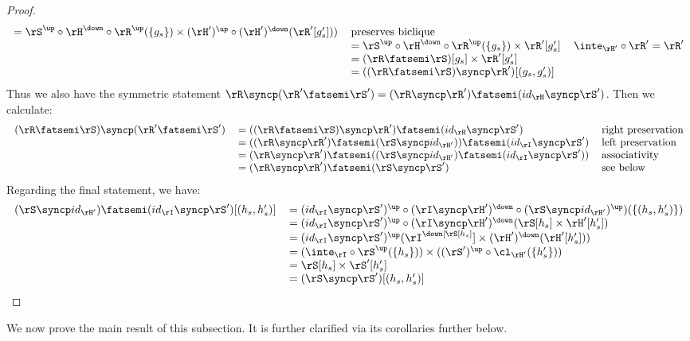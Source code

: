 \documentclass{article}
\begin{document}
\begin{proof}
\[\begin{tabular}{lll}
$= \rS^\up \circ \rH^\down \circ \rR^\up(\{g_s\}) \times (\rH')^\up \circ (\rH')^\down(\rR'[g'_s]))$
& preserves biclique
\\&
$= \rS^\up \circ \rH^\down \circ \rR^\up(\{g_s\}) \times \rR'[g'_s]$
& $\inte_{\rH'} \circ \rR' = \rR'$
\\&
$= (\rR \fatsemi \rS)[g_s] \times \rR'[g'_s]$
\\&
$= ((\rR \fatsemi \rS) \syncp \rR')[(g_s,g'_s)]$
\end{tabular}
\]
Thus we also have the symmetric statement $\rR \syncp (\rR' \fatsemi \rS') = (\rR \syncp \rR') \fatsemi (id_{\rH} \syncp \rS')$. Then we calculate:
\[
\begin{tabular}{lll}
$(\rR \fatsemi \rS) \syncp (\rR' \fatsemi \rS')$
&
$= ((\rR \fatsemi \rS) \syncp \rR') \fatsemi (id_{\rH} \syncp \rS')$
& right preservation
\\&
$= ((\rR \syncp \rR') \fatsemi (\rS \syncp id_{\rH'})) \fatsemi (id_\rI \syncp \rS')$
& left preservation
\\&
$= (\rR \syncp \rR') \fatsemi ((\rS \syncp id_{\rH'}) \fatsemi (id_\rI \syncp \rS'))$
& associativity
\\&
$= (\rR \syncp \rR') \fatsemi (\rS \syncp \rS')$
& see below
\end{tabular}
\]
Regarding the final statement, we have:
\[
\begin{tabular}{lll}
$(\rS \syncp id_{\rH'}) \fatsemi (id_\rI \syncp \rS' )[(h_s,h'_s)]$
&
$= (id_\rI \syncp \rS')^\up \circ (\rI \syncp \rH')^\down \circ (\rS \syncp id_{\rH'})^\up)(\{(h_s,h'_s)\})$
\\&
$= (id_\rI \syncp \rS')^\up \circ (\rI \syncp \rH')^\down(\rS[h_s] \times \rH'[h'_s])$
\\&
$= (id_\rI \syncp \rS')^\up (\rI^\down[\rS[h_s]] \times (\rH')^\down(\rH'[h'_s]))$
\\&
$= (\inte_\rI \circ \rS^\up(\{h_s\})) \times ((\rS')^\up \circ \cl_{\rH'}(\{h'_s\}))$
\\&
$= \rS[h_s] \times \rS'[h'_s]$
\\&
$= (\rS \syncp \rS')[(h_s,h'_s)]$
\end{tabular}
\]
\end{proof}


We now prove the main result of this subsection. It is further clarified via its corollaries further below.
\end{document}
